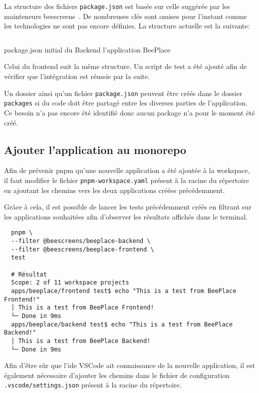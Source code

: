 La structure des fichiers \texttt{package.json} est basée sur celle suggérée par les mainteneurs \gls{beescreens}~\cite{aboutpnpmbeescreens}. De nombreuses clés sont omises pour l'instant comme les technologies ne sont pas encore définies. La structure actuelle est la suivante:

\begin{listing}[h]
  \inputminted{json}{assets/figures/package.json}
  \caption{package.json initial du Backend l'application BeePlace}
\end{listing}

Celui du frontend suit la même structure. Un script de test a été ajouté afin de vérifier que l'intégration est réussie par la suite.

Un dossier ainsi qu'un fichier \texttt{package.json} peuvent être créés dans le dossier \texttt{packages} si du code doit être partagé entre les diverses parties de l'application. Ce besoin n'a pas encore été identifié donc aucun package n'a pour le moment été créé.

\subsection{Ajouter l'application au monorepo}

Afin de prévenir \gls{pnpm} qu'une nouvelle application a été ajoutée à la workspace, il faut modifier le fichier \texttt{pnpm-workspace.yaml} présent à la racine du répertoire en ajoutant les chemins vers les deux applications créées précédemment.


Grâce à cela, il est possible de lancer les tests précédemment créés en filtrant sur les applications souhaitées afin d'observer les résultats affichés dans le terminal.

\begin{verbatim}
  pnpm \
  --filter @beescreens/beeplace-backend \
  --filter @beescreens/beeplace-frontend \
  test

  # Résultat
  Scope: 2 of 11 workspace projects
  apps/beeplace/frontend test$ echo "This is a test from BeePlace Frontend!"
  │ This is a test from BeePlace Frontend!
  └─ Done in 9ms
  apps/beeplace/backend test$ echo "This is a test from BeePlace Backend!"
  │ This is a test from BeePlace Backend!
  └─ Done in 9ms
\end{verbatim}

Afin d'être sûr que l'\gls{ide} VSCode ait connaissance de la nouvelle application, il est également nécessaire d'ajouter les chemins dans le fichier de configuration \texttt{.vscode/settings.json} présent à la racine du répertoire.

